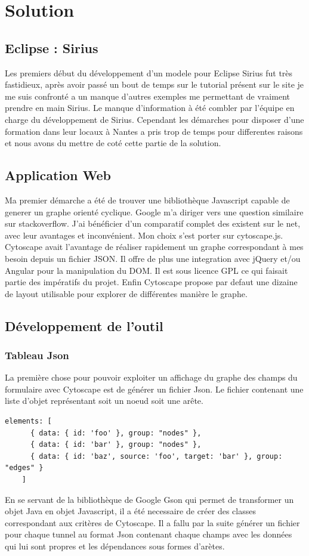 \chapter{Solution}

\section{Eclipse : Sirius}
Les premiers début du développement d’un modele pour Eclipse Sirius fut très fastidieux, après avoir passé un bout de temps sur le tutorial présent sur le site je me suis confronté a un manque d’autres exemples me permettant de vraiment prendre en main Sirius. Le manque d'information à été combler par l'équipe en charge du développement de Sirius. Cependant les démarches pour disposer d'une formation dans leur locaux à Nantes a pris trop de temps pour differentes raisons et nous avons du mettre de coté cette partie de la solution.

\section{Application Web}
Ma premier démarche a été de trouver une bibliothèque Javascript capable de generer un graphe orienté cyclique. Google m’a diriger vers une question similaire sur stackoverflow. J’ai bénéficier d'un comparatif complet des existent sur le net, avec leur avantages et inconvénient. Mon choix s’est porter sur cytoscape.js. Cytoscape avait l’avantage de réaliser rapidement un graphe correspondant à mes besoin depuis un fichier JSON. Il offre de plus une integration avec jQuery et/ou Angular pour la manipulation du DOM. Il est sous licence GPL ce qui faisait partie des impératifs du projet. Enfin Cytoscape propose par defaut une dizaine de layout utilisable pour explorer de différentes manière le graphe.
\clearpage
\section{Développement de l'outil}

\subsection{Tableau Json}
La première chose pour pouvoir exploiter un affichage du graphe des champs du formulaire avec Cytoscape est de générer un fichier Json. Le fichier contenant une liste d'objet représentant soit un noeud soit une arête. 
\begin{lstlisting}
elements: [
      { data: { id: 'foo' }, group: "nodes" },
      { data: { id: 'bar' }, group: "nodes" },
      { data: { id: 'baz', source: 'foo', target: 'bar' }, group: "edges" }
    ]
\end{lstlisting}
En se servant de la bibliothèque de Google Gson qui permet de transformer un objet Java en objet Javascript, il a été necessaire de créer des classes correspondant aux critères de Cytoscape. Il a fallu par la suite générer un fichier pour chaque tunnel au format Json contenant chaque champs avec les données qui lui sont propres et les dépendances sous formes d'arètes.

